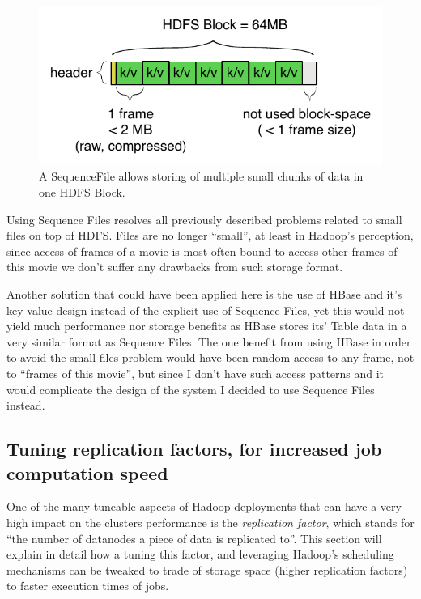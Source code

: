 \begin{figure}[ch!]
  \centering
  \includegraphics[scale=0.9]{diagrams/sequence-file.pdf}
  \caption{A SequenceFile allows storing of multiple small chunks of data in one HDFS Block.}
  \label{fig:sequence-file}
\end{figure}

Using Sequence Files resolves all previously described problems related to small files on top of HDFS. Files are no longer ``small'', at least in Hadoop's perception,
since access of frames of a movie is most often bound to access other frames of this movie we don't suffer any drawbacks from such storage format.

Another solution that could have been applied here is the use of HBase and it's key-value design instead of the explicit use of Sequence Files, yet this would not yield much performance nor storage benefits as HBase stores its' Table data in a very similar format as Sequence Files. The one benefit from using HBase in order to avoid the small files problem would have been random access to any frame, not to ``frames of this movie'', but since I don't have such access patterns and it would complicate the design of the system I decided to use Sequence Files instead.



\subsection{Tuning replication factors, for increased job computation speed}
\label{sec:tuning-replication-factors}
One of the many tuneable aspects of Hadoop deployments that can have a very high impact on the clusters performance is the \textit{replication factor}, which stands for ``the number of datanodes a piece of data is replicated to''. This section will explain in detail how a tuning this factor, and leveraging Hadoop's scheduling mechanisms can be tweaked to trade of storage space (higher replication factors) to faster execution times of jobs.

